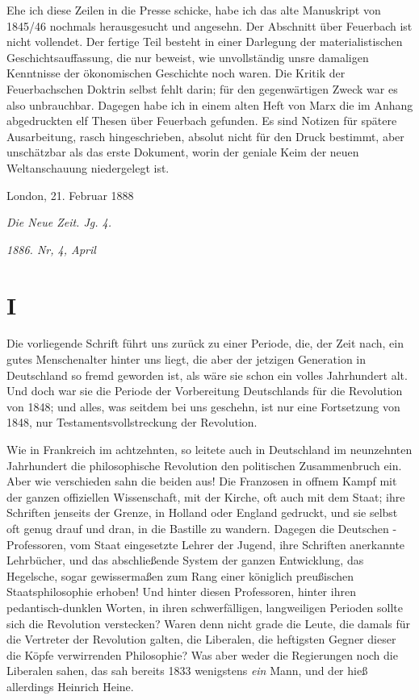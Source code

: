 Ehe ich diese Zeilen in die Presse schicke, habe ich das alte
Manuskript von 1845/46 nochmals herausgesucht und angesehn. Der
Abschnitt über Feuerbach ist nicht vollendet. Der fertige Teil besteht
in einer Darlegung der materialistischen Geschichtsauffassung, die nur
beweist, wie unvollständig unsre damaligen Kenntnisse der ökonomischen
Geschichte noch waren. Die Kritik der Feuerbachschen Doktrin selbst
fehlt darin; für den gegenwärtigen Zweck war es also unbrauchbar.
Dagegen habe ich in einem alten Heft von Marx die im Anhang
abgedruckten elf Thesen über Feuerbach gefunden. Es sind Notizen für
spätere Ausarbeitung, rasch hingeschrieben, absolut nicht für den Druck
bestimmt, aber unschätzbar als das erste Dokument, worin der geniale
Keim der neuen Weltanschauung niedergelegt ist.

\bigskip

\hfill{}London, 21. Februar 1888

\quebra

\hfill{}\emph{Die Neue Zeit. Jg. 4.}

\hfill{}\emph{1886. Nr, 4, April}

\section{I}

Die vorliegende
Schrift führt uns zurück zu einer
Periode, die, der Zeit nach, ein gutes Menschenalter hinter uns liegt,
die aber der jetzigen Generation in Deutschland so fremd geworden ist,
als wäre sie schon ein volles Jahrhundert alt. Und doch war sie die
Periode der Vorbereitung Deutschlands für die Revolution von 1848; und
alles, was seitdem bei uns geschehn, ist nur eine Fortsetzung von 1848,
nur Testamentsvollstreckung der Revolution.

Wie in Frankreich im achtzehnten, so leitete auch in Deutschland
im neunzehnten Jahrhundert die philosophische Revolution den politischen
Zusammenbruch ein. Aber wie verschieden sahn die beiden aus! Die
Franzosen in offnem Kampf mit der ganzen offiziellen Wissenschaft, mit
der Kirche, oft auch mit dem Staat; ihre Schriften jenseits der Grenze,
in Holland oder England gedruckt, und sie selbst oft genug drauf und
dran, in die Bastille zu wandern. Dagegen die Deutschen - Professoren,
vom Staat eingesetzte Lehrer der Jugend, ihre Schriften anerkannte
Lehrbücher, und das abschließende System der ganzen Entwicklung, das
Hegelsche, sogar gewissermaßen zum Rang einer königlich preußischen
Staatsphilosophie erhoben! Und hinter diesen Professoren, hinter ihren
pedantisch-dunklen Worten, in ihren schwerfälligen, langweiligen
Perioden sollte sich die Revolution verstecken? Waren denn nicht grade
die Leute, die damals für die Vertreter der Revolution galten, die
Liberalen, die heftigsten Gegner dieser die Köpfe verwirrenden
Philosophie? Was aber weder die Regierungen noch die Liberalen sahen,
das sah bereits 1833 wenigstens \emph{ein} Mann, und der hieß allerdings
Heinrich Heine.



